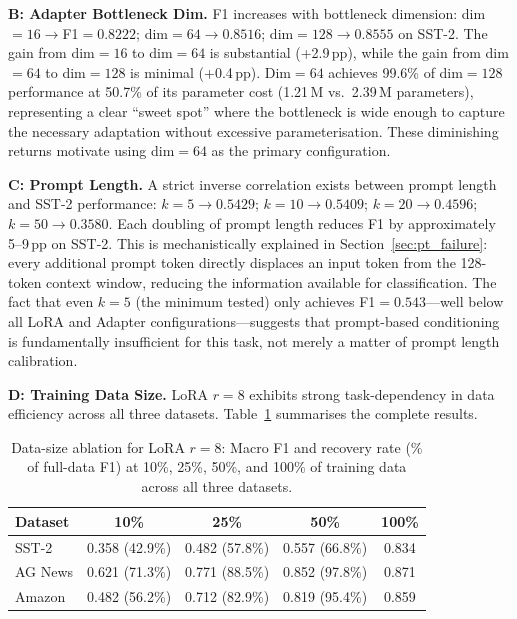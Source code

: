 \documentclass[conference]{IEEEtran}
\begin{document}
\textbf{B: Adapter Bottleneck Dim.} F1 increases with bottleneck dimension: dim$=16{\to}$F1$=0.8222$; dim$=64{\to}0.8516$; dim$=128{\to}0.8555$ on SST-2. The gain from dim$=16$ to dim$=64$ is substantial (+2.9\,pp), while the gain from dim$=64$ to dim$=128$ is minimal (+0.4\,pp). Dim$=64$ achieves 99.6\% of dim$=128$ performance at 50.7\% of its parameter cost (1.21\,M vs.\ 2.39\,M parameters), representing a clear ``sweet spot'' where the bottleneck is wide enough to capture the necessary adaptation without excessive parameterisation. These diminishing returns motivate using dim$=64$ as the primary configuration.

\textbf{C: Prompt Length.} A strict inverse correlation exists between prompt length and SST-2 performance: $k{=}5{\to}0.5429$; $k{=}10{\to}0.5409$; $k{=}20{\to}0.4596$; $k{=}50{\to}0.3580$. Each doubling of prompt length reduces F1 by approximately 5--9\,pp on SST-2. This is mechanistically explained in Section~\ref{sec:pt_failure}: every additional prompt token directly displaces an input token from the 128-token context window, reducing the information available for classification. The fact that even $k{=}5$ (the minimum tested) only achieves F1$=0.543$---well below all LoRA and Adapter configurations---suggests that prompt-based conditioning is fundamentally insufficient for this task, not merely a matter of prompt length calibration.

\textbf{D: Training Data Size.} LoRA $r{=}8$ exhibits strong task-dependency in data efficiency across all three datasets. Table~\ref{tab:data_ablation} summarises the complete results.

\begin{table}[ht]
\centering
\caption{Data-size ablation for LoRA $r{=}8$: Macro F1 and recovery rate (\% of full-data F1) at 10\%, 25\%, 50\%, and 100\% of training data across all three datasets.}
\label{tab:data_ablation}
\renewcommand{\arraystretch}{1.2}
\setlength{\tabcolsep}{4pt}
\begin{tabular}{lcccc}
\toprule
\textbf{Dataset} & \textbf{10\%} & \textbf{25\%} & \textbf{50\%} & \textbf{100\%}\\
\midrule
SST-2   & 0.358 (42.9\%) & 0.482 (57.8\%) & 0.557 (66.8\%) & 0.834\\
AG News & 0.621 (71.3\%) & 0.771 (88.5\%) & 0.852 (97.8\%) & 0.871\\
Amazon  & 0.482 (56.2\%) & 0.712 (82.9\%) & 0.819 (95.4\%) & 0.859\\
\bottomrule
\end{tabular}
\end{table}
\end{document}
